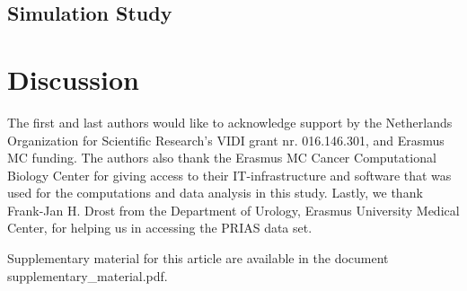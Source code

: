 \documentclass[Afour,sagev,times]{sagej}
\begin{document}
\subsection{Simulation Study}
\section{Discussion}

\begin{acks}
The first and last authors would like to acknowledge support by the Netherlands Organization for Scientific Research's VIDI grant nr. 016.146.301, and Erasmus MC funding. The authors also thank the Erasmus MC Cancer Computational Biology Center for giving access to their IT-infrastructure and software that was used for the computations and data analysis in this study. Lastly, we thank Frank-Jan H. Drost from the Department of Urology, Erasmus University Medical Center, for helping us in accessing the PRIAS data set.
\end{acks}

\begin{sm}
Supplementary material for this article are available in the document supplementary\_material.pdf.
\end{sm}





\end{document}
